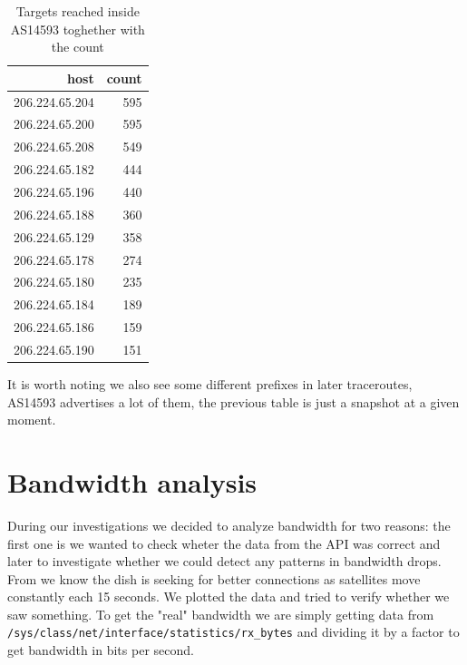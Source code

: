 \documentclass[IN,11pt,twoside,openright,bachelor,english]{tumthesis}
\begin{document}
\begin{table}[]
	\centering
	\begin{tabular}{ r r }
		\toprule
		host           & count \\ 
		\midrule
		206.224.65.204 & 595   \\
		206.224.65.200 & 595   \\
		206.224.65.208 & 549   \\ 
		206.224.65.182 & 444   \\
		206.224.65.196 & 440   \\ 
		206.224.65.188 & 360   \\ 
		206.224.65.129 & 358   \\ 
		206.224.65.178 & 274   \\ 
		206.224.65.180 & 235   \\ 
		206.224.65.184 & 189   \\ 
		206.224.65.186 & 159   \\ 
		206.224.65.190 & 151   \\
		\bottomrule
	\end{tabular}
	\caption{Targets reached inside AS14593 toghether with the count}
	\end{table}

It is worth noting we also see some different prefixes in later traceroutes, AS14593 advertises a lot of them, the previous table is just a snapshot at a given moment.

\section{Bandwidth analysis}
\label{sec:bw}
During our investigations we decided to analyze bandwidth for two reasons: the first one is we wanted to check wheter the data from the API was correct and later to investigate whether we could detect any patterns in bandwidth drops. From \cite{llc-application} we know the dish is seeking for better connections as satellites move constantly each 15 seconds. We plotted the data and tried to verify whether we saw something.
To get the "real" bandwidth we are simply getting data from \texttt{/sys/class/net/{interface}/statistics/rx\_bytes} and dividing it by a factor to get bandwidth in bits per second.
\end{document}

